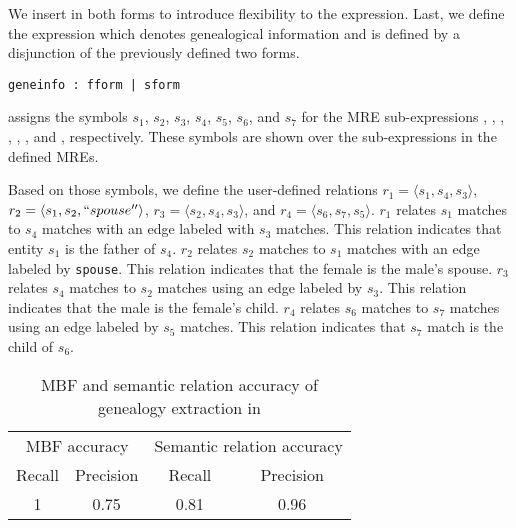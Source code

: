 \begin{appendices}
We insert  in both forms to introduce flexibility to the expression. 
Last, we define the expression  which denotes genealogical information and is defined by a disjunction of the previously defined two forms.

\begin{Verbatim}[fontsize=\relsize{-1}]
geneinfo : fform | sform
\end{Verbatim}

\framework assigns the symbols $s_1$, $s_2$, $s_3$, $s_4$, $s_5$, $s_6$, and $s_7$ for the MRE sub-expressions , , , , , , and , respectively. 
These symbols are shown over the sub-expressions in the defined MREs.

Based on those symbols, we define the user-defined relations $r_1=\langle s_1,s_4,s_3\rangle$, $r_2=\langle s_1,s_2,``spouse''\rangle$, $r_3=\langle s_2,s_4,s_3\rangle$, and $r_4=\langle s_6,s_7,s_5\rangle$. 
$r_1$ relates $s_1$ matches to $s_4$ matches with an edge labeled with $s_3$ matches. 
This relation indicates that entity $s_1$ is the father of $s_4$. 
$r_2$ relates $s_2$ matches to $s_1$ matches with an edge labeled by {\tt spouse}. 
This relation indicates that the female is the male's spouse. 
$r_3$ relates $s_4$ matches to $s_2$ matches using an edge labeled by $s_3$. 
This relation indicates that the male is the female's child. 
$r_4$ relates $s_6$ matches to $s_7$ matches using an edge labeled by $s_5$ matches. 
This relation indicates that $s_7$ match is the child of $s_6$.

\begin{table}[tb!]
  \centering
  \caption{MBF and semantic relation accuracy of genealogy extraction in \framework}
    \begin{tabular}{c|c|c|c}
     \toprule
     \multicolumn{2}{c|}{MBF accuracy} & \multicolumn{2}{c}{Semantic relation accuracy}\\
     Recall & Precision & Recall & Precision \\
    \midrule
    1 & 0.75 & 0.81 & 0.96 \\
    \bottomrule
    \end{tabular}%
  \label{tab:gmbfer}%
\end{table}%


\end{appendices}
